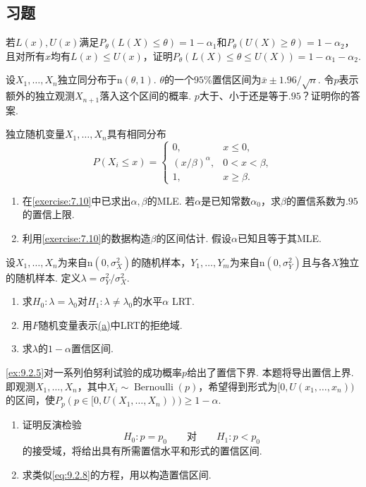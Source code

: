 \subsection{习题}\label{sec:9.4}
\begin{exercise}\label{exercise:9.1}
若$L(x),U(x)$满足$P_\theta(L(X)\le\theta)=1-\alpha_1$和$P_\theta(U(X)\ge\theta)=1-\alpha_2$，且对所有$x$均有$L(x)\le U(x)$，证明$P_\theta(L(X)\le\theta\le U(X))=1-\alpha_1-\alpha_2$.
\end{exercise}
\begin{exercise}\label{exercise:9.2}
设$X_1,\ldots,X_n$独立同分布于$\mathrm n(\theta,1)$. $\theta$的一个$95\%$置信区间为$\bar x\pm1.96/\sqrt n$. 令$p$表示额外的独立观测$X_{n+1}$落入这个区间的概率. $p$大于、小于还是等于$.95$？证明你的答案.
\end{exercise}
\begin{exercise}\label{exercise:9.3}
独立随机变量$X_1,\ldots,X_n$具有相同分布
$$P(X_i\le x)=\begin{cases}0,&x\le0,\\(x/\beta)^\alpha,&0<x<\beta,\\1,&x\ge\beta.\end{cases}$$
\begin{enumerate}
\item 在\autoref{exercise:7.10}中已求出$\alpha,\beta$的MLE. 若$\alpha$是已知常数$\alpha_0$，求$\beta$的置信系数为$.95$的置信上限.
\item 利用\autoref{exercise:7.10}的数据构造$\beta$的区间估计. 假设$\alpha$已知且等于其MLE.
\end{enumerate}
\end{exercise}
\begin{exercise}\label{exercise:9.4}
设$X_1,\ldots,X_n$为来自$\mathrm n(0,\sigma_X^2)$的随机样本，$Y_1,\ldots,Y_m$为来自$\mathrm n(0,\sigma_Y^2)$且与各$X$独立的随机样本. 定义$\lambda=\sigma_Y^2/\sigma_X^2$.
\begin{enumerate}
\item\label{item:9.4.a}求$H_0:\lambda=\lambda_0$对$H_1:\lambda\ne\lambda_0$的水平$\alpha$ LRT.
\item 用$F$随机变量表示\hyperref[item:9.4.a]{(a)}中LRT的拒绝域.
\item 求$\lambda$的$1-\alpha$置信区间.
\end{enumerate}
\end{exercise}
\begin{exercise}\label{exercise:9.5}
\autoref{ex:9.2.5}对一系列伯努利试验的成功概率$p$给出了置信下界. 本题将导出置信上界. 即观测$X_1,\ldots,X_n$，其中$X_i\sim\operatorname{Bernoulli}(p)$，希望得到形式为$[0,U(x_1,\ldots,x_n))$的区间，使$P_p(p\in[0,U(X_1,\ldots,X_n)))\ge1-\alpha$.
\begin{enumerate}
\item 证明反演检验
$$H_0:p=p_0\qquad\text{对}\qquad H_1:p<p_0$$
的接受域，将给出具有所需置信水平和形式的置信区间.
\item 求类似\eqref{eq:9.2.8}的方程，用以构造置信区间.
\end{enumerate}
\end{exercise}
